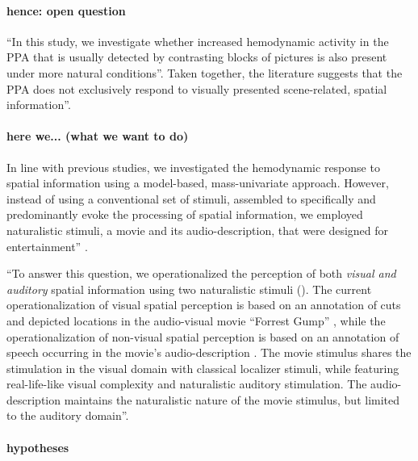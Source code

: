 \paragraph{hence: open question}

``In this study, we investigate whether increased hemodynamic activity in the
PPA that is usually detected by contrasting blocks of pictures is also present
under more natural conditions''.
Taken together, the literature suggests that the PPA does not exclusively
respond to visually presented scene-related, spatial information''.


\paragraph{here we... (what we want to do)}

In line with previous studies, we investigated the hemodynamic response to
spatial information using a model-based, mass-univariate approach.
However, instead of using a conventional set of stimuli, assembled to
specifically and predominantly evoke the processing of spatial information, we
employed naturalistic stimuli, a movie and its audio-description, that were
designed for entertainment'' \citep{haeusler2022processing}.

``To answer this question, we operationalized the perception of both
\textit{visual and auditory} spatial information using two naturalistic stimuli
(\citep[see reviews][]{hamilton2018revolution, hasson2008neurocinematics,
sonkusare2019naturalistic}).
The current operationalization of visual spatial perception is based on an
annotation of cuts and depicted locations in the audio-visual movie ``Forrest
Gump'' \citep{haeusler2016cutanno}, while
the operationalization of non-visual spatial perception is based on an
annotation of speech occurring in the movie's audio-description
\citep{haeusler2021speechanno}.
The movie stimulus shares the stimulation in the visual domain with classical
localizer stimuli, while featuring real-life-like visual complexity and
naturalistic auditory stimulation. The audio-description maintains the
naturalistic nature of the movie stimulus, but limited to the auditory domain''.

\paragraph{hypotheses}

